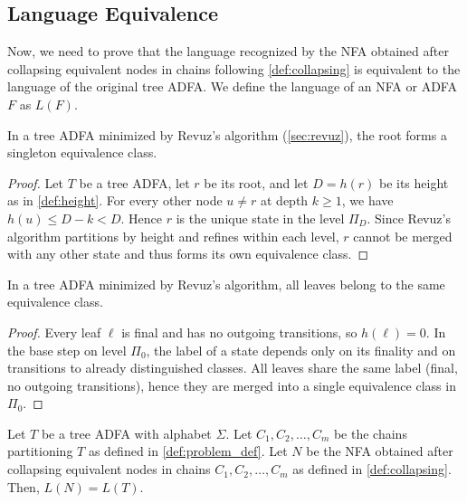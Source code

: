 \subsection{Language Equivalence}
Now, we need to prove that the language recognized by the NFA obtained after collapsing equivalent nodes in chains following \cref{def:collapsing} is equivalent to the language of the original tree ADFA. We define the language of an NFA or ADFA $F$ as $L(F)$.

\begin{lemma}
    \label{lemma:root_singleton}
    In a tree ADFA minimized by Revuz’s algorithm (\cref{sec:revuz}), the root forms a singleton equivalence class.
\end{lemma}
\begin{proof}
    Let $T$ be a tree ADFA, let $r$ be its root, and let $D = h(r)$ be its height as in \cref{def:height}. For every other node $u \neq r$ at depth $k \ge 1$, we have $h(u) \le D - k < D$. Hence $r$ is the unique state in the level $\Pi_D$. Since Revuz’s algorithm partitions by height and refines within each level, $r$ cannot be merged with any other state and thus forms its own equivalence class.
\end{proof}

\begin{lemma}
    \label{lemma:all_leaves_same_class}
    In a tree ADFA minimized by Revuz’s algorithm, all leaves belong to the same equivalence class.
\end{lemma}
\begin{proof}
    Every leaf $\ell$ is final and has no outgoing transitions, so $h(\ell) = 0$. In the base step on level $\Pi_0$, the label of a state depends only on its finality and on transitions to already distinguished classes. All leaves share the same label (final, no outgoing transitions), hence they are merged into a single equivalence class in $\Pi_0$.
\end{proof}

\begin{lemma}
    \label{lemma:collapsing_equivalence}
    Let $T$ be a tree ADFA with alphabet $\Sigma$. Let $C_1, C_2, \ldots, C_m$ be the chains partitioning $T$ as defined in \cref{def:problem_def}. Let $N$ be the NFA obtained after collapsing equivalent nodes in chains $C_1, C_2, \ldots, C_m$ as defined in \cref{def:collapsing}. Then, $L(N) = L(T)$.
\end{lemma}

